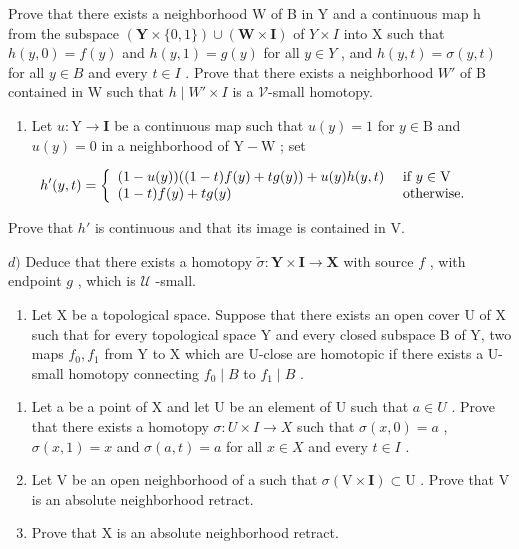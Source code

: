 Prove that there exists a neighborhood W of B in Y and a continuous map h from the subspace \((\mathbf{Y} \times \{0,1\}) \cup (\mathbf{W} \times \mathbf{I})\) of \(Y \times I\) into X such that \(h(y,0) = f(y)\) and \(h(y,1) = g(y)\) for all \(y \in Y\) , and \(h(y,t) = \sigma(y,t)\) for all \(y \in B\) and every \(t \in I\) . Prove that there exists a neighborhood \(W'\) of B contained in W such that \(h \mid W' \times I\) is a \(\mathcal{V}\)-small homotopy.

\begin{enumerate}
\def\labelenumi{\alph{enumi})}
\setcounter{enumi}{2}
\tightlist
\item
  Let \(u \colon \mathrm{Y} \to \mathbf{I}\) be a continuous map such that \(u(y) = 1\) for \(y \in \mathrm{B}\) and \(u(y) = 0\) in a neighborhood of \(\mathrm{Y} - \mathrm{W}\) ; set
\end{enumerate}

\[
h ^ {\prime} (y, t) = \left\{ \begin{array}{l l} (1 - u (y)) ((1 - t) f (y) + t g (y)) + u (y) h (y, t) & \text { if } y \in \mathrm{V} \\ (1 - t) f (y) + t g (y) & \text { otherwise. } \end{array} \right.
\]

Prove that \(h'\) is continuous and that its image is contained in V.

\(d)\) Deduce that there exists a homotopy \(\widetilde{\sigma}\colon\mathbf{Y}\times\mathbf{I}\to\mathbf{X}\) with source \(f\) , with endpoint \(g\) , which is \(\mathcal{U}\) -small.

\begin{enumerate}
\def\labelenumi{\arabic{enumi})}
\setcounter{enumi}{9}
\tightlist
\item
  Let X be a topological space. Suppose that there exists an open cover U of X such that for every topological space Y and every closed subspace B of Y, two maps \(f_{0}, f_{1}\) from Y to X which are U-close are homotopic if there exists a U-small homotopy connecting \(f_{0} \mid B\) to \(f_{1} \mid B\) .
\end{enumerate}

\begin{enumerate}
\def\labelenumi{\alph{enumi})}
\item
  Let a be a point of X and let U be an element of U such that \(a \in U\) . Prove that there exists a homotopy \(\sigma: U \times I \to X\) such that \(\sigma(x,0) = a\) , \(\sigma(x,1) = x\) and \(\sigma(a,t) = a\) for all \(x \in X\) and every \(t \in I\) .
\item
  Let V be an open neighborhood of a such that \(\sigma(\mathrm{V} \times \mathbf{I}) \subset \mathrm{U}\) . Prove that V is an absolute neighborhood retract.
\item
  Prove that X is an absolute neighborhood retract.
\end{enumerate}

